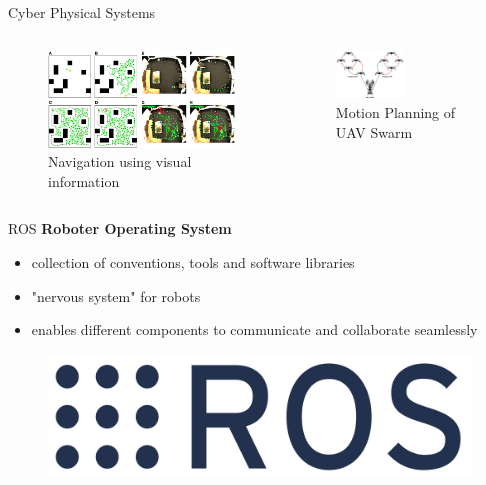 \documentclass[11pt,t,usepdftitle=false,aspectratio=169]{beamer}
\begin{document}
\begin{frame}{Cyber Physical Systems}
   \begin{columns}
      \begin{column}{.455\textwidth}
         \begin{figure}
            \includegraphics{images/navigation.jpeg}
            \caption{Navigation using visual information \cite{navigation}}
         \end{figure}
      \end{column}
      \begin{column}{.455\textwidth} 
         \begin{figure}            
            \includegraphics[width=0.5\textwidth]{images/distributed.png}
            \caption{Motion Planning of UAV Swarm \cite{Iqbal22}}
         \end{figure}
      \end{column}
   \end{columns}
\end{frame}

\begin{frame}{ROS}
   \textbf{Roboter Operating System}
   \begin{itemize}
      \item collection of conventions, tools and software libraries
      \item "nervous system" for robots
      \item enables different components to communicate and collaborate seamlessly
   \end{itemize}
   \bigbreak
   \begin{figure}
      \includegraphics[width=.15\textwidth]{images/ros_logo.png}
   \end{figure}
   
\end{frame}
\end{document}
